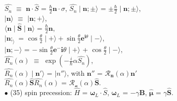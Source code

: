 \documentclass[10pt,fancy]{elegantbook}
\begin{document}
{$\hat{S_n}$ $\equiv$ $\mathbf n \cdot \hat{S}$ = $\frac{\hbar}{2} \mathbf n \cdot \sigma$, $\hat{S_n} \mid \mathbf n; \pm \rangle$ =  $\pm \frac{\hbar}{2} \mid \mathbf n; \pm \rangle$, \\ 
$\mid \mathbf n \rangle$ $\equiv$ $\mid \mathbf n ; + \rangle$,  \\
 $\langle \mathbf n \mid  \hat{\mathbf S} \mid \mathbf n \rangle$ = $\frac{\hbar}{2} \mathbf n$,  \\    
$\mid \mathbf n; _ \rangle$ = $\cos \frac{\theta}{2} \mid + \rangle + \sin \frac{\theta}{2} \mathbf{e}^{\mathbf{i} \theta} \mid - \rangle$, \\   
$\mid \mathbf n; - \rangle$ = $- \sin \frac{\theta}{2} \mathbf{e}^- {\mathbf{i} \theta} \mid + \rangle$ + $\cos \frac{\theta}{2} \mid - \rangle$, \\   
$\hat{R_n} (\alpha)$ $\equiv$ $\exp(- \frac{i}{\hbar} \alpha \hat{S_n})$, \\ 
$\hat{R_n} (\alpha) \mid \mathbf n' \rangle$ = $\mid n'' \rangle$, with $ \mathbf n''$ = $\mathcal{R_\mathbf n} (\alpha) \mathbf n'$ \\
$\hat{R_n}(\alpha) \hat{\mathbf S} \hat{R_n}(\alpha)$ = $\mathcal{R_n}(\alpha) \hat{\mathbf S}$. \\

$\bullet$ (35) spin precession: $ \hat{H}$ = $ {\mathbf \omega_L} \cdot \hat{S}$, $ {\mathbf \omega_L}$ = $ - \gamma{\mathbf B}$, $ \hat{\mathbf \mu}$ = $ \gamma \hat{\mathbf S}$.  \\

}
\end{document}
